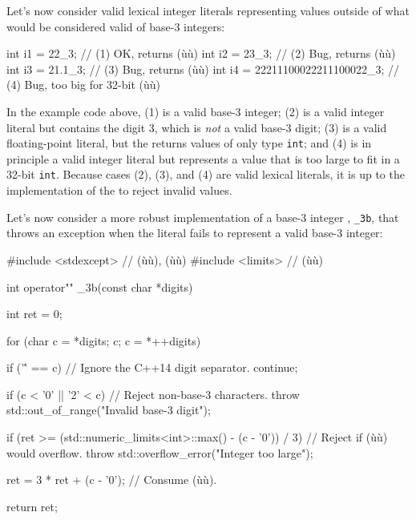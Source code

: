 Let's now consider valid lexical integer literals representing values
outside of what would be considered valid of base-3 integers:

\begin{emcppslisting}[emcppsbatch=e11]
int i1 = 22_3;                    // (1) OK, returns (ù{}ù)
int i2 = 23_3;                    // (2) Bug, returns (ù{}ù)
int i3 = 21.1_3;                  // (3) Bug, returns (ù{}ù)
int i4 = 22211100022211100022_3;  // (4) Bug, too big for 32-bit (ù{}ù)
\end{emcppslisting}

\noindent In the example code above, (1) is a valid base-3 integer; (2) is a valid
integer literal but contains the digit 3, which is \emph{not} a valid
base-3 digit; (3) is a valid floating-point literal, but the  returns values of only type \lstinline!int!; and (4) is in
principle a valid integer literal but represents a value that is too
large to fit in a 32-bit \lstinline!int!. Because cases (2), (3), and (4)
are valid lexical literals, it is up to the implementation of the
 to reject invalid values.

Let's now consider a more robust implementation of a base-3 integer
, \lstinline!_3b!, that throws an exception when the literal
fails to represent a valid base-3 integer:

\begin{emcppslisting}
#include <stdexcept>  // (ù{}ù), (ù{}ù)
#include <limits>     // (ù{}ù)

int operator"" _3b(const char *digits)
{
    int ret = 0;

    for (char c = *digits; c; c = *++digits)
    {
        if ('\'' == c)  // Ignore the C++14 digit separator.
        {
            continue;
        }

        if (c < '0' || '2' < c)  // Reject non-base-3 characters.
        {
            throw std::out_of_range("Invalid base-3 digit");
        }

        if (ret >= (std::numeric_limits<int>::max() - (c - '0')) / 3)
        {
            // Reject if (ù{}ù) would overflow.
            throw std::overflow_error("Integer too large");
        }

        ret = 3 * ret + (c - '0');  // Consume (ù{}ù).
    }

    return ret;
}
\end{emcppslisting}

